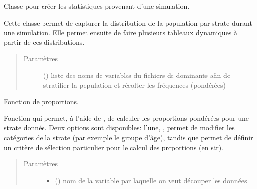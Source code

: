 \documentclass[letterpaper,10pt,french]{sphinxmanual}
\begin{document}

\begin{fulllineitems}
\label{\detokenize{utilisation:id7}}
Classe pour créer les statistiques provenant d’une simulation.

Cette classe permet de capturer la distribution de la population par strate durant une simulation. Elle permet ensuite de faire plusieurs tableaux dynamiques à partir de ces distributions.
\begin{quote}\begin{description}
\item[{Paramètres}] \leavevmode
{} () \textendash{} liste des noms de variables du fichiers de dominants afin de stratifier la population et récolter les fréquences (pondérées)

\end{description}\end{quote}

\begin{fulllineitems}
\label{\detokenize{utilisation:simgen.statistics.prop}}
Fonction de proportions.

Fonction qui permet, à l’aide de , de calculer les proportions pondérées pour une strate donnée. Deux options sont disponibles: l’une, , permet de modifier les catégories de la strate (par exemple le groupe d’âge), tandis que  permet de définir un critère de sélection particulier pour le calcul des proportions (en str).
\begin{quote}\begin{description}
\item[{Paramètres}] \leavevmode\begin{itemize}
\item {} 
 () \textendash{} nom de la variable par laquelle on veut découper les données


\end{itemize}
\end{description}
\end{quote}
\end{fulllineitems}
\end{fulllineitems}
\end{document}
